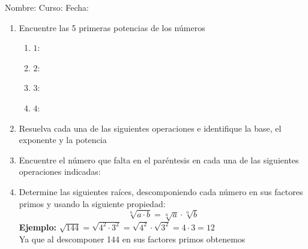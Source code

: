 \documentclass[fleqn]{article}
\newcommand{\LineaNombre}{%
\par
\vspace{\baselineskip}
Nombre:\hrulefill \; Curso: \underline{\hspace*{48pt}} \; Fecha: \underline{\hspace*{2.5cm}} \relax
\par}
\begin{document}
\LineaNombre
\begin{enumerate}
  \item Encuentre las 5 primeras potencias de los números
  \begin{enumerate}
    \item $ 1 $: \hrulefill
    \item $ 2 $: \hrulefill
    \item $ 3 $: \hrulefill
    \item $ 4 $: \hrulefill
  \end{enumerate}
  \item Resuelva cada una de las siguientes operaciones e identifique la base, el exponente y la potencia
  \begin{enumerate}
  \end{enumerate}
  \item Encuentre el número que falta en el paréntesis en cada una de las siguientes operaciones indicadas:
  \begin{enumerate}
  \end{enumerate}
  \item Determine las siguientes raíces, descomponiendo cada número en sus factores primos y usando la siguiente propiedad:
  \[ \sqrt[n]{a\cdot b}=\sqrt[n]{a}\cdot\sqrt[n]{b} \]
  \textbf{Ejemplo:} $ \sqrt{144}=\sqrt{4^2\cdot3^2 }= \sqrt{4^2}\cdot\sqrt{3^2}=4\cdot3=12$\\
  Ya que al descomponer 144 en sus factores primos obtenemos\\

\end{enumerate}
\end{document}
